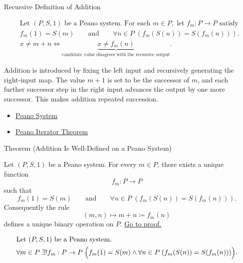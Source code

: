 \begin{topicbox}{Recursive Definition of Addition}
\begin{remark*}
\[
\begin{aligned}
&\text{Let } (P,S,1) \text{ be a Peano system. For each } m \in P,
\text{ let } f_m : P \to P \text{ satisfy}\\
&f_m(1)=S(m)
\qquad\text{and}\qquad
\forall n \in P\;(f_m(S(n))=S(f_m(n))).\\
&x \neq m+n
\Longleftrightarrow
\underbrace{x \neq f_m(n)}_{\text{candidate value disagrees with the recursive output}}.
\end{aligned}
\]
\end{remark*}

\begin{remark*}[Interpretation]
Addition is introduced by fixing the left input and recursively generating the
right-input map. The value $m+1$ is set to be the successor of $m$, and each
further successor step in the right input advances the output by one more
successor. This makes addition repeated succession.
\end{remark*}

\begin{dependencies}
\begin{itemize}
  \item \hyperref[def:peano-system]{Peano System}
  \item \hyperref[thm:peano-iterator-theorem]{Peano Iterator Theorem}
\end{itemize}
\end{dependencies}

\begin{theorembox}{Theorem (Addition Is Well-Defined on a Peano System)}
\begin{theorem}
\label{thm:addition-well-defined-on-peano-system}
Let $(P,S,1)$ be a Peano system. For every $m \in P$, there exists a unique
function
\[
f_m : P \to P
\]
such that
\[
f_m(1)=S(m)
\qquad\text{and}\qquad
\forall n \in P\;(f_m(S(n))=S(f_m(n))).
\]
Consequently the rule
\[
(m,n) \longmapsto m+n \coloneqq f_m(n)
\]
defines a unique binary operation on $P$.
\hyperref[prf:addition-well-defined-on-peano-system]{Go to proof.}
\end{theorem}
\end{theorembox}

\begin{remark*}
\[
\begin{aligned}
&\text{Let } (P,S,1) \text{ be a Peano system.}\\
&\forall m \in P\;\exists! f_m : P \to P\;
\Bigl(f_m(1)=S(m) \land
\forall n \in P\;(f_m(S(n))=S(f_m(n)))\Bigr).
\end{aligned}
\]
\end{remark*}


\end{topicbox}
